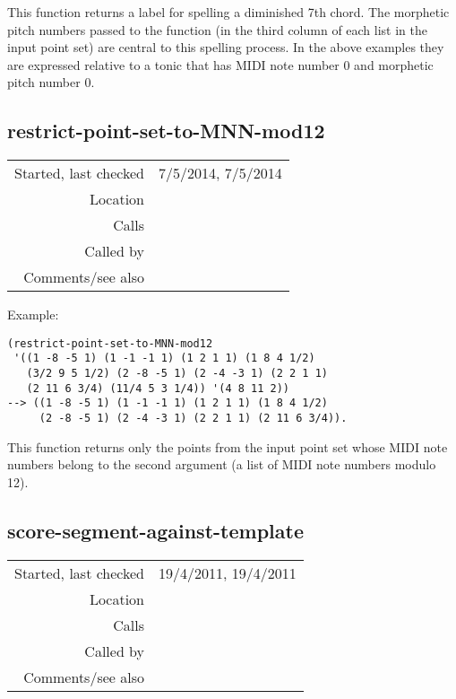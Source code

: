 \noindent This function returns a label for spelling
a diminished 7th chord. The morphetic pitch numbers
passed to the function (in the third column of each
list in the input point set) are central to this
spelling process. In the above examples they are
expressed relative to a tonic that has MIDI note
number 0 and morphetic pitch number 0.


\subsection*{restrict-point-set-to-MNN-mod12}\label{fun:restrict-point-set-to-MNN-mod12}

\vspace{0.3cm}
\begin{tabular}{r|p{8cm}}
Started, last checked & 7/5/2014, 7/5/2014 \\
Location & \nameref{sec:chord-labelling} \\
Calls & \\
Called by & \nameref{fun:HarmAn->roman} \\
Comments/see also & \nameref{fun:restrict-dataset-in-nth-to-xs}
\end{tabular}

\vspace{0.5cm}
\noindent Example:
\begin{verbatim}
(restrict-point-set-to-MNN-mod12
 '((1 -8 -5 1) (1 -1 -1 1) (1 2 1 1) (1 8 4 1/2)
   (3/2 9 5 1/2) (2 -8 -5 1) (2 -4 -3 1) (2 2 1 1)
   (2 11 6 3/4) (11/4 5 3 1/4)) '(4 8 11 2))
--> ((1 -8 -5 1) (1 -1 -1 1) (1 2 1 1) (1 8 4 1/2)
     (2 -8 -5 1) (2 -4 -3 1) (2 2 1 1) (2 11 6 3/4)).
\end{verbatim}

\noindent This function returns only the points from
the input point set whose MIDI note numbers belong
to the second argument (a list of MIDI note numbers
modulo 12).


\subsection*{score-segment-against-template}\label{fun:score-segment-against-template}

\vspace{0.3cm}
\begin{tabular}{r|p{8cm}}
Started, last checked & 19/4/2011, 19/4/2011 \\
Location & \nameref{sec:chord-labelling} \\
Calls & \nameref{fun:a-list-in-b-list} \\
Called by & \nameref{fun:max-argmax-of-segment-scores} \\
Comments/see also & 
\end{tabular}

